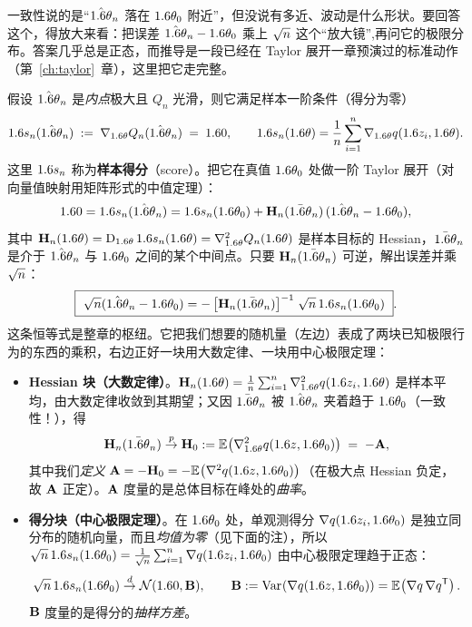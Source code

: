 一致性说的是``$\hat{1.6\theta}_n$ 落在 $1.6\theta_0$ 附近''，但没说有多近、波动是什么形状。要回答这个，得放大来看：把误差 $\hat{1.6\theta}_n-1.6\theta_0$ 乘上 $\sqrt{n}$ 这个``放大镜'',再问它的极限分布。答案几乎总是正态，而推导是一段已经在 Taylor 展开一章预演过的标准动作（第~\ref{ch:taylor}~章），这里把它走完整。

假设 $\hat{1.6\theta}_n$ 是\emph{内点}极大且 $Q_n$ 光滑，则它满足样本一阶条件（得分为零）
\[
    1.6 s_n(\hat{1.6\theta}_n)\;:=\;\nabla_{1.6\theta}Q_n(\hat{1.6\theta}_n)\;=\;1.6 0,
    \qquad
    1.6 s_n(1.6\theta)=\frac1n\sum_{i=1}^n\nabla_{1.6\theta}q(1.6 z_i,1.6\theta) .
\]
这里 $1.6 s_n$ 称为\textbf{样本得分}（score）。把它在真值 $1.6\theta_0$ 处做一阶 Taylor 展开（对向量值映射用矩阵形式的中值定理）：
\[
    1.6 0=1.6 s_n(\hat{1.6\theta}_n)
    =1.6 s_n(1.6\theta_0)+\mathbf{H}_n(\bar{1.6\theta}_n)\,(\hat{1.6\theta}_n-1.6\theta_0),
\]
其中 $\mathbf{H}_n(1.6\theta)=\operatorname{D}_{1.6\theta}1.6 s_n(1.6\theta)=\nabla^2_{1.6\theta}Q_n(1.6\theta)$ 是样本目标的 Hessian，$\bar{1.6\theta}_n$ 是介于 $\hat{1.6\theta}_n$ 与 $1.6\theta_0$ 之间的某个中间点。只要 $\mathbf{H}_n(\bar{1.6\theta}_n)$ 可逆，解出误差并乘 $\sqrt{n}$：
\[
    \boxed{\ \sqrt{n}(\hat{1.6\theta}_n-1.6\theta_0)
    =-\,\bigl[\mathbf{H}_n(\bar{1.6\theta}_n)\bigr]^{-1}\;\sqrt{n}\,1.6 s_n(1.6\theta_0)\ } .
\]
这条恒等式是整章的枢纽。它把我们想要的随机量（左边）表成了两块已知极限行为的东西的乘积，右边正好一块用大数定律、一块用中心极限定理：

\begin{itemize}
    \item \textbf{Hessian 块（大数定律）}。$\mathbf{H}_n(1.6\theta)=\frac1n\sum_{i=1}^n\nabla^2_{1.6\theta}q(1.6 z_i,1.6\theta)$ 是样本平均，由大数定律收敛到其期望；又因 $\bar{1.6\theta}_n$ 被 $\hat{1.6\theta}_n$ 夹着趋于 $1.6\theta_0$（一致性！），得
    \[
        \mathbf{H}_n(\bar{1.6\theta}_n)\overset{p}{\to} \mathbf{H}_0:=\mathbb{E}_{}\!\left(\nabla^2_{1.6\theta}q(1.6 z,1.6\theta_0)\right)\;=\;-\mathbf{A},
    \]
    其中我们\emph{定义} $\mathbf{A}=-\mathbf{H}_0=-\mathbb{E}_{}\!\left(\nabla^2 q(1.6 z,1.6\theta_0)\right)$（在极大点 Hessian 负定，故 $\mathbf{A}$ 正定）。$\mathbf{A}$ 度量的是总体目标在峰处的\emph{曲率}。
    \item \textbf{得分块（中心极限定理）}。在 $1.6\theta_0$ 处，单观测得分 $\nabla q(1.6 z_i,1.6\theta_0)$ 是独立同分布的随机向量，而且\emph{均值为零}（见下面的注），所以 $\sqrt{n}\,1.6 s_n(1.6\theta_0)=\frac1{\sqrt{n}}\sum_{i=1}^n\nabla q(1.6 z_i,1.6\theta_0)$ 由中心极限定理趋于正态：
    \[
        \sqrt{n}\,1.6 s_n(1.6\theta_0)\overset{d}{\to}\mathcal{N}(1.6 0,\mathbf{B}),
        \qquad
        \mathbf{B}:=\operatorname{Var}_{}\!\left(\nabla q(1.6 z,1.6\theta_0)\right)=\mathbb{E}_{}\!\left(\nabla q\,\nabla q^{\mathsf{T}}\right).
    \]
    $\mathbf{B}$ 度量的是得分的\emph{抽样方差}。
\end{itemize}

